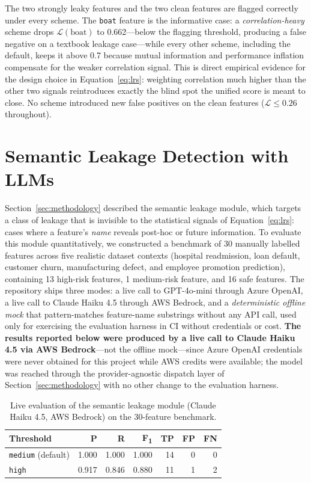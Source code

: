 \documentclass[12pt,a4paper]{report}
\newcommand{\tblhead}{\rowcolor{tblHeadBg}\color{white}\bfseries}
\begin{document}
The two strongly leaky features and the two clean features are flagged correctly under
every scheme.  The \texttt{boat} feature is the informative case: a \emph{correlation-heavy}
scheme drops $\mathcal{L}(\text{boat})$ to 0.662---below the flagging threshold, producing
a false negative on a textbook leakage case---while every other scheme, including the
default, keeps it above 0.7 because mutual information and performance inflation
compensate for the weaker correlation signal.  This is direct empirical evidence for the
design choice in Equation~\eqref{eq:lrs}: weighting correlation much higher than the other
two signals reintroduces exactly the blind spot the unified score is meant to close.  No
scheme introduced new false positives on the clean features ($\mathcal{L}\le0.26$
throughout).

\section{Semantic Leakage Detection with LLMs}
\label{sec:semantic_eval}

Section~\ref{sec:methodology} described the semantic leakage module, which
targets a class of leakage that is invisible to the statistical signals of
Equation~\eqref{eq:lrs}: cases where a feature's \emph{name} reveals post-hoc or future
information.  To evaluate this module quantitatively, we constructed a benchmark of 30
manually labelled features across five realistic dataset contexts (hospital readmission,
loan default, customer churn, manufacturing defect, and employee promotion prediction),
containing 13 high-risk features, 1 medium-risk feature, and 16 safe features.  The
repository ships three modes: a live call to GPT-4o-mini through Azure OpenAI, a live call
to Claude Haiku 4.5 through AWS Bedrock, and a \emph{deterministic offline mock} that
pattern-matches feature-name substrings without any API call, used only for exercising the
evaluation harness in CI without credentials or cost.  \textbf{The results reported below
were produced by a live call to Claude Haiku 4.5 via AWS Bedrock}---not the offline
mock---since Azure OpenAI credentials were never obtained for this project while AWS
credits were available; the model was reached through the provider-agnostic dispatch layer
of Section~\ref{sec:methodology} with no other change to the evaluation harness.

\begin{table}[!ht]
\centering
\caption{Live evaluation of the semantic leakage module (Claude Haiku 4.5, AWS Bedrock) on
  the 30-feature benchmark.}
\label{tab:semantic_eval}
\scriptsize
{}
\begin{tabular}{lrrrrrr}
\toprule
\tblhead \textbf{Threshold} & \textbf{P} & \textbf{R} & \textbf{F\textsubscript{1}} & \textbf{TP} & \textbf{FP} & \textbf{FN} \\
\midrule
\texttt{medium} (default) & 1.000 & 1.000 & 1.000 & 14 & 0 & 0 \\
\texttt{high}             & 0.917 & 0.846 & 0.880 & 11 & 1 & 2 \\
\bottomrule
\end{tabular}
\end{table}
\end{document}
